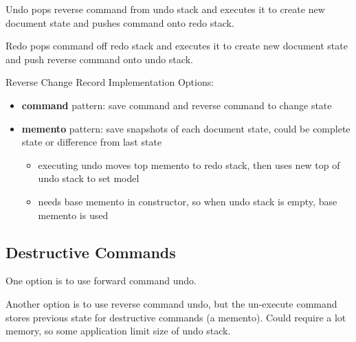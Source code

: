 \documentclass[11pt]{article}
\begin{document}
Undo pops reverse command from undo stack and executes it to create new document state and
pushes command onto redo stack.

Redo pops command off redo stack and executes it to create new document state and push reverse
command onto undo stack.

Reverse Change Record Implementation Options:
\begin{itemize}
\item \textbf{command} pattern: save command and reverse command to change state
\item \textbf{memento} pattern: save snapshots of each document state, could be complete state or
difference from last state
\begin{itemize}
\item executing undo moves top memento to redo stack, then uses new top of undo stack to set model
\item needs base memento in constructor, so when undo stack is empty, base memento is used
\end{itemize}
\end{itemize}
\subsection{Destructive Commands}
\label{sec:orga377dc3}
One option is to use forward command undo.

Another option is to use reverse command undo, but the un-execute command stores previous state for
destructive commands (a memento).
Could require a lot memory, so some application limit size of undo stack.
\end{document}
